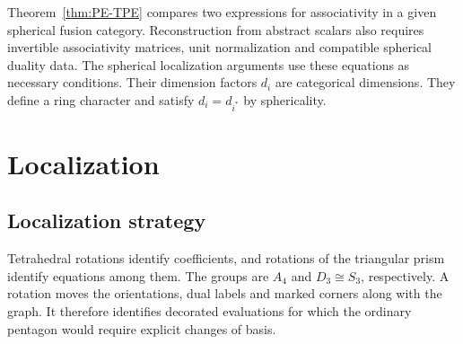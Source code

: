 \documentclass{amsart}
\begin{document}
Theorem~\ref{thm:PE-TPE} compares two expressions for associativity in a given spherical fusion category. Reconstruction from abstract scalars also requires invertible associativity matrices, unit normalization and compatible spherical duality data. The spherical localization arguments use these equations as necessary conditions. Their dimension factors $d_i$ are categorical dimensions. They define a ring character \cite[Proposition~4.7.12]{EGNO15} and satisfy $d_i=d_{i^*}$ by sphericality.

\section{Localization}

\subsection{Localization strategy} \label{sec:loc}
Tetrahedral rotations identify coefficients, and rotations of the triangular prism identify equations among them. The groups are $A_4$ and $D_3\cong S_3$, respectively. A rotation moves the orientations, dual labels and marked corners along with the graph. It therefore identifies decorated evaluations for which the ordinary pentagon would require explicit changes of basis.
\end{document}
